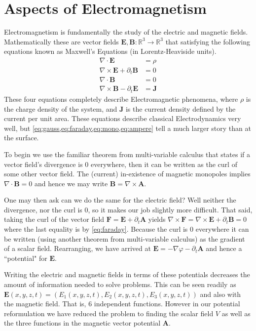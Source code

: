 \section{Aspects of Electromagnetism}

Electromagnetism is fundamentally the study of the electric and magnetic fields. Mathematically these are vector fields $\mathbf{E},\mathbf{B}: \mathbb{R}^3 \to \mathbb{R}^3$ that satisfying the following equations known as Maxwell's Equations (in Lorentz-Heaviside units).
\begin{align}
\nabla\cdot\mathbf{E} & = \rho \label{eq:gauss}\\
\nabla\times\mathbf{E} + \partial_t\mathbf{B} & = 0 \label{eq:faraday} \\
\nabla\cdot\mathbf{B} & = 0 \label{eq:mono}\\
\nabla\times\mathbf{B} - \partial_t\mathbf{E} & = \mathbf{J} \label{eq:ampere}
\end{align}
These four equations completely describe Electromagnetic phenomena, where $\rho$ is the charge density of the system, and $\mathbf{J}$ is the current density defined by the current per unit area. These equations describe classical Electrodynamics very well, but \cref{eq:gauss,eq:faraday,eq:mono,eq:ampere} tell a much larger story than at the surface.

To begin we use the familiar theorem from multi-variable calculus that states if a vector field's divergence is 0 everywhere, then it can be written as the curl of some other vector field. The (current) in-existence of magnetic monopoles implies $\nabla \cdot \mathbf{B} = 0$ and hence we may write $\mathbf{B} = \nabla\times\mathbf{A}$.

One may then ask can we do the same for the electric field? Well neither the divergence, nor the curl is 0, so it makes our job slightly more difficult. That said, taking the curl of the vector field $\mathbf{F} = \mathbf{E} + \partial_t\mathbf{A}$ yields $\nabla\times\mathbf{F} = \nabla\times\mathbf{E} + \partial_t\mathbf{B} = 0$ where the last equality is by \cref{eq:faraday}. Because the curl is 0 everywhere it can be written (using another theorem from multi-variable calculus) as the gradient of a scalar field. Rearranging, we have arrived at $\mathbf{E} = -\nabla \varphi - \partial_t \mathbf{A}$ and hence a ``potential" for $\mathbf{E}$.

Writing the electric and magnetic fields in terms of these potentials decreases the amount of information needed to solve problems. This can be seen readily as $\mathbf{E}(x,y,z,t) = (E_1(x,y,z,t),E_2(x,y,z,t),E_3(x,y,z,t))$ and also with the magnetic field. That is, 6 independent functions. However in our potential reformulation we have reduced the problem to finding the scalar field $V$ as well as the three functions in the magnetic vector potential $\mathbf{A}$.

